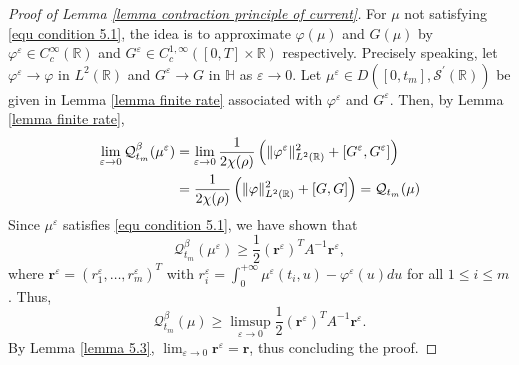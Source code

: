 \documentclass[reqno,11pt]{amsart}
\numberwithin{equation}{section}
\newcommand{\R}{\mathbb{R}}
\newcommand{\Scal}{\mathcal{S}}
\begin{document}
\begin{proof}[Proof of Lemma \ref{lemma contraction principle of current}]
	For $\mu$ not satisfying \eqref{equ condition 5.1}, the idea is to approximate $\varphi (\mu)$ and $G (\mu)$ by $\varphi^\varepsilon \in C^\infty_c (\R)$ and $G^{\varepsilon} \in C_c^{1,\infty} ([0,T] \times \R)$ respectively.  Precisely speaking, let  $\varphi^\varepsilon  \rightarrow \varphi$ in $L^2(\R)$ and $G^{\varepsilon}  \rightarrow G$ in $\mathbb{H}$ as $\varepsilon \rightarrow 0$.  Let $\mu^\varepsilon \in D ([0, t_m], \Scal^\prime(\R))$ be given in Lemma \ref{lemma finite rate} associated with $\varphi^\varepsilon $ and $G^{\varepsilon}$. 
	Then, by Lemma \ref{lemma finite rate},
	\begin{align}\label{equ limit in proof of Lemma 5.2}
		\lim_{\varepsilon\rightarrow 0}\mathcal{Q}^\beta_{t_m}(\mu^\varepsilon)&=  \lim_{\varepsilon\rightarrow 0} \frac{1}{2\chi (\rho)} \left(\|\varphi^\varepsilon\|_{L^2(\R)}^2+ [G^{\varepsilon},G^{\varepsilon}]\right) \notag\\
		&=\frac{1}{2\chi (\rho)} \left(\|\varphi\|_{L^2(\R)}^2+ [G,G]\right)=\mathcal{Q}_{t_m}(\mu)
	\end{align}
	Since $\mu^\varepsilon$ satisfies \eqref{equ condition 5.1},  we have shown that
	\[
	\mathcal{Q}^\beta_{t_m} (\mu^\varepsilon)\geq \frac{1}{2} (\mathbf{r}^\varepsilon)^T A^{-1} \mathbf{r}^\varepsilon,
	\]
	where $\mathbf{r}^\varepsilon=(r^\varepsilon_1,\ldots, r^\varepsilon_m)^T$ with $r^\varepsilon_i=\int_0^{+\infty}\mu^\varepsilon(t_i,u)-\varphi^\varepsilon (u) du$ for all $1\leq i\leq m$.  Thus,
	\[\mathcal{Q}_{t_m}^\beta (\mu) \geq    \limsup_{\varepsilon\rightarrow 0} \frac{1}{2} (\mathbf{r}^\varepsilon)^T A^{-1} \mathbf{r}^\varepsilon.\]
By Lemma \ref{lemma 5.3},  $\lim_{\varepsilon \rightarrow 0} \mathbf{r}^\varepsilon = \mathbf{r}$, thus concluding the proof. 
\end{proof}
\end{document}
